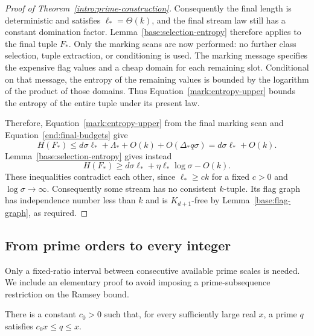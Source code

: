 \begin{proof}[Proof of Theorem~\ref{intro:prime-construction}]
Consequently the final length is deterministic and satisfies
$\ell_*=\Theta(k)$, and the final stream law still has a constant
domination factor. Lemma~\ref{base:selection-entropy} therefore
applies to the final tuple $F_*$. Only the marking scans are now
performed: no further class selection, tuple extraction, or
conditioning is used. The marking message specifies the expensive
flag values and a cheap domain for each remaining slot. Conditional
on that message, the entropy of the remaining values is bounded by
the logarithm of the product of those domains. Thus
Equation~\eqref{mark:entropy-upper} bounds the entropy of the entire
tuple under its present law.

Therefore, Equation~\eqref{mark:entropy-upper} from the final
marking scan and Equation~\eqref{end:final-budgets} give
\[
 H(F_*)\le d\sigma\ell_*+\Lambda_*+O(k)+O(\Delta_*q\sigma)
          =d\sigma\ell_*+O(k).
\]
Lemma~\ref{base:selection-entropy} gives instead
\[
 H(F_*)\ge d\sigma\ell_*+\eta\ell_*\log\sigma-O(k).
\]
These inequalities contradict each other, since
$\ell_*\ge c k$ for a fixed $c>0$ and $\log\sigma\to\infty$.
Consequently some stream has no consistent $k$-tuple. Its flag graph
has independence number less than $k$ and is $K_{d+1}$-free by
Lemma~\ref{base:flag-graph}, as required.
\end{proof}

\subsection{From prime orders to every integer}

Only a fixed-ratio interval between consecutive available prime scales
is needed. We include an elementary proof to avoid imposing a
prime-subsequence restriction on the Ramsey bound.

\begin{lemma}
\label{end:prime-interval}
There is a constant $c_0>0$ such that, for every sufficiently large real
$x$, a prime $q$ satisfies $c_0x\le q\le x$.
\end{lemma}

